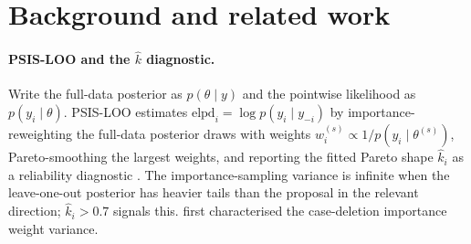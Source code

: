 \documentclass[11pt]{article}
\newcommand{\elpd}{\mathrm{elpd}}
\newcommand{\khat}{\hat{k}}
\begin{document}
\section{Background and related work}\label{sec:prior}

\paragraph{PSIS-LOO and the $\khat$ diagnostic.}
Write the full-data posterior as $p(\theta \mid y)$ and the pointwise likelihood
as $p(y_i \mid \theta)$. PSIS-LOO estimates
$\elpd_i = \log p(y_i \mid y_{-i})$ by importance-reweighting the full-data
posterior draws with weights $w_i^{(s)} \propto 1/p(y_i \mid \theta^{(s)})$,
Pareto-smoothing the largest weights, and reporting the fitted Pareto shape
$\khat_i$ as a reliability diagnostic \citep{vehtari2017practical,
vehtari2024pareto}. The importance-sampling variance is infinite when the
leave-one-out posterior has heavier tails than the proposal in the relevant
direction; $\khat_i > 0.7$ signals this. \citet{peruggia1997variance} first
characterised the case-deletion importance weight variance.
\end{document}
